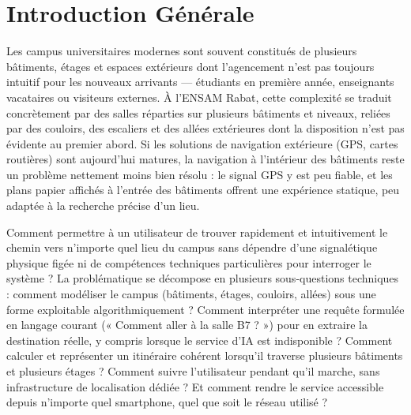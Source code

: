 \documentclass[12pt,a4paper]{report}
\begin{document}
\listoffigures
{}
\listoftables
{}
\tableofcontents

\clearpage
{}

\chapter*{Introduction Générale}

Les campus universitaires modernes sont souvent constitués de plusieurs bâtiments, étages et
espaces extérieurs dont l'agencement n'est pas toujours intuitif pour les nouveaux arrivants —
étudiants en première année, enseignants vacataires ou visiteurs externes. À l'ENSAM Rabat, cette
complexité se traduit concrètement par des salles réparties sur plusieurs bâtiments et niveaux,
reliées par des couloirs, des escaliers et des allées extérieures dont la disposition n'est pas
évidente au premier abord. Si les solutions de navigation extérieure (GPS, cartes routières) sont
aujourd'hui matures, la navigation à l'intérieur des bâtiments reste un problème nettement moins
bien résolu : le signal GPS y est peu fiable, et les plans papier affichés à l'entrée des bâtiments
offrent une expérience statique, peu adaptée à la recherche précise d'un lieu.

Comment permettre à un utilisateur de trouver rapidement et intuitivement le chemin vers
n'importe quel lieu du campus sans dépendre d'une signalétique physique figée ni de compétences
techniques particulières pour interroger le système ? La problématique se décompose en plusieurs
sous-questions techniques : comment modéliser le campus (bâtiments, étages, couloirs, allées)
sous une forme exploitable algorithmiquement ? Comment interpréter une requête formulée en
langage courant (« Comment aller à la salle B7 ? ») pour en extraire la destination réelle, y
compris lorsque le service d'IA est indisponible ? Comment calculer et représenter un itinéraire
cohérent lorsqu'il traverse plusieurs bâtiments et plusieurs étages ? Comment suivre l'utilisateur
pendant qu'il marche, sans infrastructure de localisation dédiée ? Et comment rendre le service
accessible depuis n'importe quel smartphone, quel que soit le réseau utilisé ?
\end{document}
